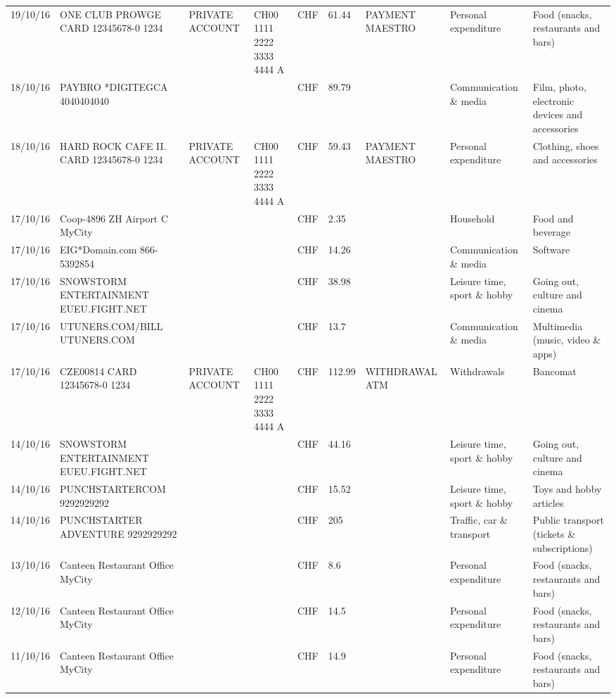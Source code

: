 \begin{landscape}
\begin{adjustwidth}{-2cm}{-2cm}
\begin{tiny}
\begin{longtable}{lp{4cm}llllp{3cm}ll}
		19/10/16 & ONE CLUB PROWGE CARD 12345678-0 1234 & PRIVATE ACCOUNT & CH00 1111 2222 3333 4444 A & CHF   & 61.44 & PAYMENT MAESTRO & Personal expenditure & Food (snacks, restaurants and bars) \\
		18/10/16 & PAYBRO *DIGITEGCA      4040404040 &       &       & CHF   & 89.79 &       & Communication \& media & Film, photo, electronic devices and accessories \\
		18/10/16 & HARD ROCK CAFE II. CARD 12345678-0 1234 & PRIVATE ACCOUNT & CH00 1111 2222 3333 4444 A & CHF   & 59.43 & PAYMENT MAESTRO & Personal expenditure & Clothing, shoes and accessories \\
		17/10/16 & Coop-4896 ZH Airport C   MyCity &       &       & CHF   & 2.35  &       & Household & Food and beverage \\
		17/10/16 & EIG*Domain.com           866-5392854 &       &       & CHF   & 14.26 &       & Communication \& media & Software \\
		17/10/16 & SNOWSTORM ENTERTAINMENT EUEU.FIGHT.NET &       &       & CHF   & 38.98 &       & Leisure time, sport \& hobby & Going out, culture and cinema \\
		17/10/16 & UTUNERS.COM/BILL          UTUNERS.COM &       &       & CHF   & 13.7  &       & Communication \& media & Multimedia (music, video \& apps) \\
		17/10/16 & CZE00814 CARD 12345678-0 1234 & PRIVATE ACCOUNT & CH00 1111 2222 3333 4444 A & CHF   & 112.99 & WITHDRAWAL ATM & Withdrawals & Bancomat \\
		14/10/16 & SNOWSTORM ENTERTAINMENT EUEU.FIGHT.NET &       &       & CHF   & 44.16 &       & Leisure time, sport \& hobby & Going out, culture and cinema \\
		14/10/16 & PUNCHSTARTERCOM           9292929292 &       &       & CHF   & 15.52 &       & Leisure time, sport \& hobby & Toys and hobby articles \\
		14/10/16 & PUNCHSTARTER ADVENTURE    9292929292 &       &       & CHF   & 205   &       & Traffic, car \& transport & Public transport (tickets \& subscriptions) \\
		13/10/16 & Canteen Restaurant Office      MyCity &       &       & CHF   & 8.6   &       & Personal expenditure & Food (snacks, restaurants and bars) \\
		12/10/16 & Canteen Restaurant Office      MyCity &       &       & CHF   & 14.5  &       & Personal expenditure & Food (snacks, restaurants and bars) \\
		11/10/16 & Canteen Restaurant Office      MyCity &       &       & CHF   & 14.9  &       & Personal expenditure & Food (snacks, restaurants and bars) \\

\end{longtable}
\end{tiny}
\end{adjustwidth}
\end{landscape}
